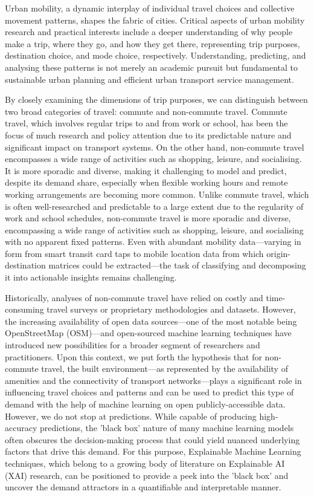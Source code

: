 
Urban mobility, a dynamic interplay of individual travel choices and collective movement patterns, shapes the fabric of cities. Critical aspects of urban mobility research and practical interests include a deeper understanding of why people make a trip, where they go, and how they get there, representing trip purposes, destination choice, and mode choice, respectively. Understanding, predicting, and analysing these patterns is not merely an academic pursuit but fundamental to sustainable urban planning and efficient urban transport service management. 

By closely examining the dimensions of trip purposes, we can distinguish between two broad categories of travel: commute and non-commute travel. Commute travel, which involves regular trips to and from work or school, has been the focus of much research and policy attention due to its predictable nature and significant impact on transport systems. On the other hand, non-commute travel encompasses a wide range of activities such as shopping, leisure, and socialising. It is more sporadic and diverse, making it challenging to model and predict, despite its demand share, especially when flexible working hours and remote working arrangements are becoming more common. Unlike commute travel, which is often well-researched and predictable to a large extent due to the regularity of work and school schedules, non-commute travel is more sporadic and diverse, encompassing a wide range of activities such as shopping, leisure, and socialising with no apparent fixed patterns. Even with abundant mobility data---varying in form from smart transit card taps to mobile location data from which origin-destination matrices could be extracted---the task of classifying and decomposing it into actionable insights remains challenging. 

Historically, analyses of non-commute travel have relied on costly and time-consuming travel surveys or proprietary methodologies and datasets. However, the increasing availability of open data sources---one of the most notable being OpenStreetMap (OSM)---and open-sourced machine learning techniques have introduced new possibilities for a broader segment of researchers and practitioners. Upon this context, we put forth the hypothesis that for non-commute travel, the built environment---as represented by the availability of amenities and the connectivity of transport networks---plays a significant role in influencing travel choices and patterns and can be used to predict this type of demand with the help of machine learning on open publicly-accessible data. However, we do not stop at predictions. While capable of producing high-accuracy predictions, the 'black box' nature of many machine learning models often obscures the decision-making process that could yield nuanced underlying factors that drive this demand. For this purpose, Explainable Machine Learning techniques, which belong to a growing body of literature on Explainable AI (XAI) research, can be positioned to provide a peek into the 'black box' and uncover the demand attractors in a quantifiable and interpretable manner. 

